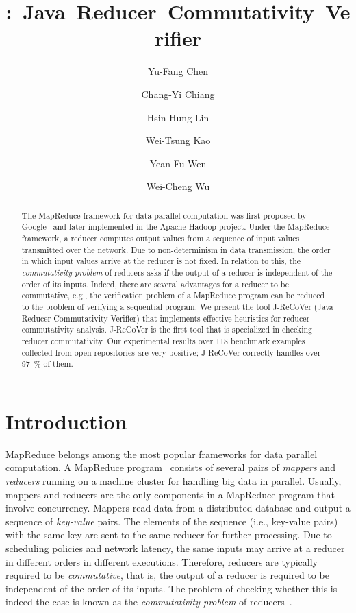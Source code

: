 \documentclass{llncs}
\title{\hspace{-0.1cm}{J-ReCoVer}:~Java~Reducer~Commutativity~Verifier}
\author{}
\institute{}
\author{
Yu-Fang Chen\inst{1}\inst{2}
\and
Chang-Yi Chiang\inst{2}
\and
Hsin-Hung Lin\inst{1}
\and
Wei-Tsung Kao\inst{1}
\and
Yean-Fu Wen\inst{2}
\and
Wei-Cheng Wu\inst{1}
}
\institute
{
Institute of Information Science, Academia Sinica, Taiwan
\and
Graduate Institute of Information Management, National Taipei University, Taiwan
}}
\author{}
\institute{}
\begin{document}

\maketitle

\vspace*{-4mm}\begin{abstract}

The MapReduce framework for data-parallel computation was first proposed by
Google~\cite{dean04} and later implemented in the Apache Hadoop
project. Under the MapReduce framework, a reducer computes output
values from a sequence of input values transmitted over the network. Due to
non-determinism in data transmission, the order in which input values arrive at
the reducer is not fixed. In relation to this, the \emph{commutativity problem}
of reducers asks if the output of a reducer is independent of the order of its
inputs. Indeed, there are several advantages for a reducer to be commutative,
e.g., the verification problem of a MapReduce program can be reduced to the
problem of verifying a sequential program. We present the tool J-ReCoVer (Java
Reducer Commutativity Verifier) that implements effective heuristics for reducer
commutativity analysis. J-ReCoVer is the first tool that is specialized in
checking reducer commutativity. Our experimental results over 118 benchmark
examples collected from open repositories are very positive; J-ReCoVer correctly
handles over 97~\% of them.

\end{abstract}

\vspace*{-4mm}
\section{Introduction} \label{section:introduction}
\vspace*{-1mm}

MapReduce belongs among the most popular frameworks for data parallel
computation. A MapReduce program~\cite{dean04} consists of several pairs of
\emph{mappers} and \emph{reducers} running on a machine cluster for handling big
data in parallel. Usually, mappers and reducers are the only components in a
MapReduce program that involve concurrency. Mappers read data from a distributed
database and output a sequence of \emph{key-value} pairs. The elements of the
sequence (i.e., key-value pairs) with the same key are sent to the same reducer
for further processing. Due to scheduling policies and network latency, the same
inputs may arrive at a reducer in different orders in different executions.
Therefore, reducers are typically required to be \emph{commutative}, that is,
the output of a reducer is required to be independent of the order of its
inputs. The problem of checking whether this is indeed the case is known as the
\emph{commutativity problem} of
reducers~\cite{csallner13testing,xiao14mr,ChenHSW15,ChenSW16}.
\end{document}
